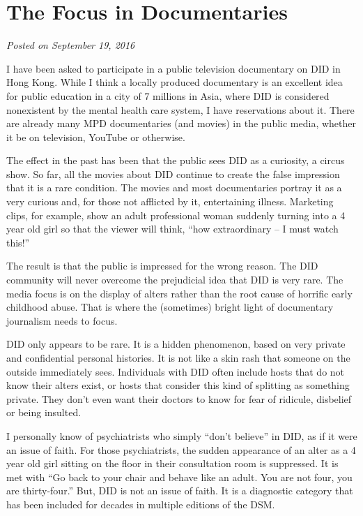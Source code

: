 \documentclass[]{book}
\begin{document}
\hypertarget{the-focus-in-documentaries}{%
\section{The Focus in Documentaries}\label{the-focus-in-documentaries}}

\emph{Posted on September 19, 2016}

I have been asked to participate in a public television documentary on DID in Hong Kong. While I think a locally produced documentary is an excellent idea for public education in a city of 7 millions in Asia, where DID is considered nonexistent by the mental health care system, I have reservations about it. There are already many MPD documentaries (and movies) in the public media, whether it be on television, YouTube or otherwise.

The effect in the past has been that the public sees DID as a curiosity, a circus show. So far, all the movies about DID continue to create the false impression that it is a rare condition. The movies and most documentaries portray it as a very curious and, for those not afflicted by it, entertaining illness. Marketing clips, for example, show an adult professional woman suddenly turning into a 4 year old girl so that the viewer will think, ``how extraordinary -- I must watch this!''

The result is that the public is impressed for the wrong reason. The DID community will never overcome the prejudicial idea that DID is very rare. The media focus is on the display of alters rather than the root cause of horrific early childhood abuse. That is where the (sometimes) bright light of documentary journalism needs to focus.

DID only appears to be rare. It is a hidden phenomenon, based on very private and confidential personal histories. It is not like a skin rash that someone on the outside immediately sees. Individuals with DID often include hosts that do not know their alters exist, or hosts that consider this kind of splitting as something private. They don't even want their doctors to know for fear of ridicule, disbelief or being insulted.

I personally know of psychiatrists who simply ``don't believe'' in DID, as if it were an issue of faith. For those psychiatrists, the sudden appearance of an alter as a 4 year old girl sitting on the floor in their consultation room is suppressed. It is met with ``Go back to your chair and behave like an adult. You are not four, you are thirty-four.'' But, DID is not an issue of faith. It is a diagnostic category that has been included for decades in multiple editions of the DSM.
\end{document}
